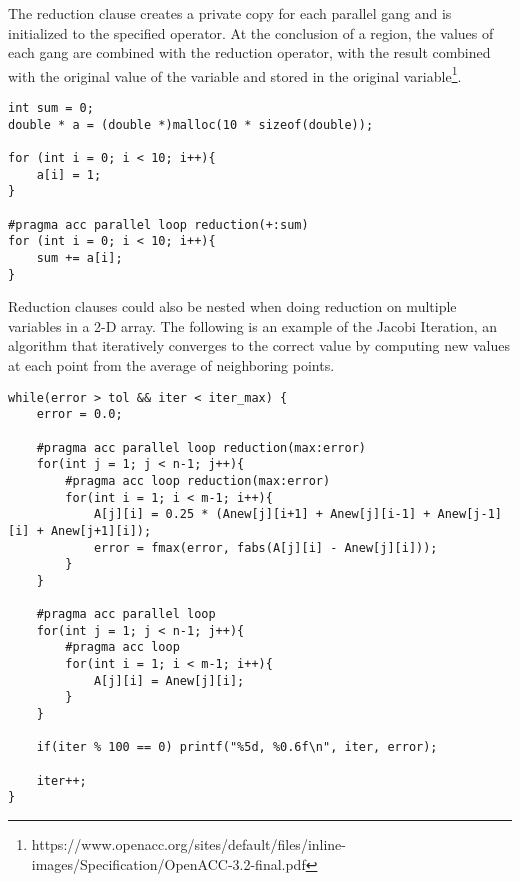 The reduction clause creates a private copy for each parallel gang and is initialized to the specified operator. At the conclusion of a region, the values of each gang are combined with the reduction operator, with the result combined with the original value of the variable and stored in the original variable\footnote{https://www.openacc.org/sites/default/files/inline-images/Specification/OpenACC-3.2-final.pdf}.

\begin{Code}
\begin{lstlisting}[frame=single, caption=reduction.c, label=prototype, numbers=none]
int sum = 0;
double * a = (double *)malloc(10 * sizeof(double));

for (int i = 0; i < 10; i++){
	a[i] = 1;
}

#pragma acc parallel loop reduction(+:sum)
for (int i = 0; i < 10; i++){
	sum += a[i];
}
\end{lstlisting}
\end{Code}

Reduction clauses could also be nested when doing reduction on multiple variables in a 2-D array. The following is an example of the Jacobi Iteration, an algorithm that iteratively converges to the correct value by computing new values at each point from the average of neighboring points\cite{OpenACCBest}.

\begin{Code}
\begin{lstlisting}[frame=single, caption=nestedReduction.c, label=prototype, numbers=none]
while(error > tol && iter < iter_max) {
	error = 0.0;

	#pragma acc parallel loop reduction(max:error)
	for(int j = 1; j < n-1; j++){
		#pragma acc loop reduction(max:error)
		for(int i = 1; i < m-1; i++){
			A[j][i] = 0.25 * (Anew[j][i+1] + Anew[j][i-1] + Anew[j-1][i] + Anew[j+1][i]);
			error = fmax(error, fabs(A[j][i] - Anew[j][i]));
		}
	}

	#pragma acc parallel loop
	for(int j = 1; j < n-1; j++){
		#pragma acc loop
		for(int i = 1; i < m-1; i++){
			A[j][i] = Anew[j][i];
		}
	}

	if(iter % 100 == 0) printf("%5d, %0.6f\n", iter, error);

	iter++;
}
\end{lstlisting}
\end{Code}